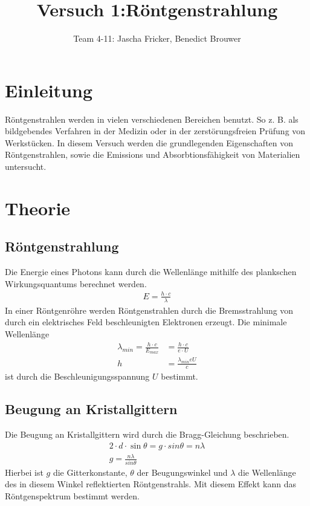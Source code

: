 \documentclass[11pt, a4paper]{article}
\title{Versuch 1:Röntgenstrahlung}
\author{Team 4-11: Jascha Fricker, Benedict Brouwer}
\begin{document}
    \maketitle

    \tableofcontents

    \newpage

    \section{Einleitung}

    Röntgenstrahlen werden in vielen verschiedenen Bereichen benutzt. So z. B. als bildgebendes Verfahren in der Medizin oder in der zerstörungsfreien Prüfung von Werkstücken. In diesem Versuch werden die grundlegenden Eigenschaften von Röntgenstrahlen, sowie die Emissions und Absorbtionsfähigkeit von Materialien untersucht.

    \section{Theorie}

    \subsection{Röntgenstrahlung}

    Die Energie eines Photons kann durch die Wellenlänge mithilfe des plankschen Wirkungsquantums berechnet werden.
    \begin{align}
        E = \frac{h \cdot c}{\lambda}
    \end{align}
    In einer Röntgenröhre werden Röntgenstrahlen durch die Bremsstrahlung von durch ein elektrisches Feld beschleunigten Elektronen erzeugt. Die minimale Wellenlänge
    \begin{align}
        \lambda_{min} = \frac{h \cdot c}{E_{max}} &= \frac{h \cdot c}{e \cdot U} \\
        h &= \frac{\lambda_{min} e U}{c} \label{eq:plank}
    \end{align}
    ist durch die Beschleunigungsspannung $U$ bestimmt.

    \subsection{Beugung an Kristallgittern}

    Die Beugung an Kristallgittern wird durch die Bragg-Gleichung beschrieben.
    \begin{align}
        2 \cdot d \cdot \sin \theta = g \cdot sin \theta = n \lambda \\
        g = \frac{n \lambda}{sin \theta} \label{eq:gitter}
    \end{align}
    Hierbei ist $g$ die Gitterkonstante, $\theta$ der Beugungswinkel und $\lambda$ die Wellenlänge des in diesem Winkel reflektierten Röntgenstrahls. Mit diesem Effekt kann das Röntgenspektrum bestimmt werden.
\end{document}
